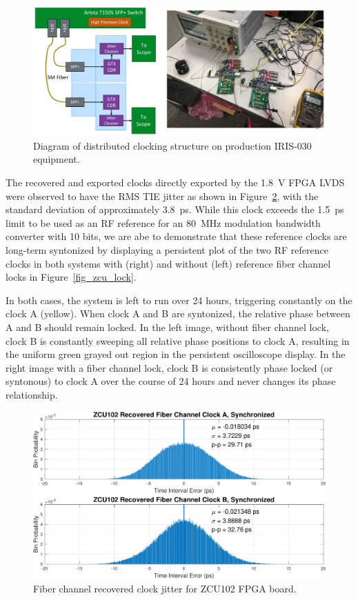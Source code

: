 \begin{figure}[p]
\centering
\includegraphics[width=1\textwidth]{figs/clk/sfp_clock_diagram}
\caption{Diagram of distributed clocking structure on production IRIS-030 equipment.}
\label{fig_sfp_diagram}
\end{figure}

The recovered and exported clocks directly exported by the 1.8~V \ac{FPGA} \ac{LVDS} were observed to have the \ac{RMS} \ac{TIE} jitter as shown in Figure~\ref{fig_030_clk_jitter}, with the standard deviation of approximately 3.8~ps.
While this clock exceeds the 1.5~ps limit to be used as an RF reference for an 80~MHz modulation bandwidth converter with 10 bits, we are abe to demonstrate that these reference clocks are long-term syntonized by displaying a persistent plot of the two RF reference clocks in both systems with (right) and without (left) reference fiber channel locks in Figure~\ref{fig_zcu_lock}.

In both cases, the system is left to run over 24 hours, triggering constantly on the clock A (yellow). When clock A and B are syntonized, the relative phase between A and B should remain locked.
In the left image, without fiber channel lock, clock B is constantly sweeping all relative phase positions to clock A, resulting in the uniform green grayed out region in the persistent oscilloscope display.
In the right image with a fiber channel lock, clock B is consistently phase locked (or syntonous) to clock A over the course of 24 hours and never changes its phase relationship.


\begin{figure}[p]
\centering
\includegraphics[width=1\textwidth]{figs/clk/zcu102_recovered_jitter}
\caption{Fiber channel recovered clock jitter for ZCU102 FPGA board.}
\label{fig_030_clk_jitter}
\end{figure}


